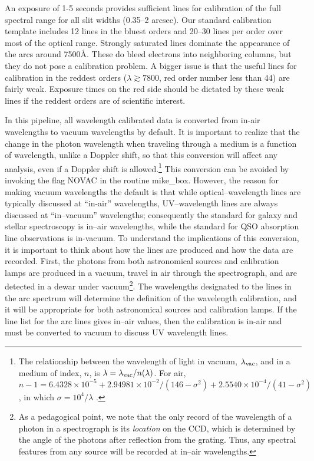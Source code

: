 \documentclass[12pt,preprint]{aastex}
\begin{document}
An exposure of 1-5 seconds provides sufficient lines for calibration
of the full spectral range for all slit widths (0.35--2 arcsec).  Our
standard calibration template includes 12 lines in the bluest orders
and 20--30 lines per order over most of the optical range.  Strongly
saturated lines dominate the appearance of the arcs around
7500\AA. These do bleed electrons into neighboring columns, but
they do not pose a calibration problem.  A bigger issue is that the
useful lines for calibration in the reddest orders 
($\lambda \gtrsim 7800$, 
red order number less than 44) are fairly weak.  Exposure times on the
red side should be dictated by these weak lines if the reddest orders
are of scientific interest.

In this pipeline, all wavelength calibrated data is converted from
in-air wavelengths to vacuum wavelengths by default.  It is important
to realize that the change in the photon wavelength when traveling
through a medium is a function of wavelength, unlike a Doppler shift,
so that this conversion will affect any analysis, even if a Doppler
shift is allowed.\footnote{The relationship between the wavelength of
  light in vacuum, $\lambda_{\rm vac}$, and in a medium of index, $n$,
  is $\lambda = \lambda_{\rm vac}/n(\lambda)$.  For air, $n-1 =
  6.4328\times 10^{-5} + 2.94981\times 10^{-2}/(146-\sigma^2) +
  2.5540\times 10^{-4}/(41-\sigma^2)$, 
  in which $\sigma=10^4/\lambda$ \citep{ciddor96}.}
This conversion can be avoided by invoking the
flag NOVAC in the routine mike\_box.  However, the reason for making vacuum
wavelengths the default is that while optical--wavelength lines are
typically discussed at ``in-air'' wavelengths, UV--wavelength lines
are always discussed at ``in--vacuum'' wavelengths; consequently the
standard for galaxy and stellar spectroscopy is in--air wavelengths,
while the standard for QSO absorption line observations is in-vacuum.
To understand the implications of this conversion, it is important to
think about how the lines are produced and how the data are
recorded.  First, the photons from both astronomical sources and
calibration lamps are produced in a vacuum, travel in air through the
spectrograph, and are detected in a dewar under vacuum\footnote{As a
  pedagogical point, we note that the only record of the wavelength of
  a photon in a spectrograph is its {\it location} on the CCD, which
  is determined by the angle of the photons after reflection from the
  grating.  Thus, any spectral features from any source will be
  recorded at in--air wavelengths.}.  The wavelengths designated to the
lines in the arc spectrum will determine the definition of the
wavelength calibration, and it will be appropriate for both
astronomical sources and calibration lamps.  If the line list for the
arc lines gives in--air values, then the calibration is in-air and
must be converted to vacuum to discuss UV wavelength lines.  
\end{document}
